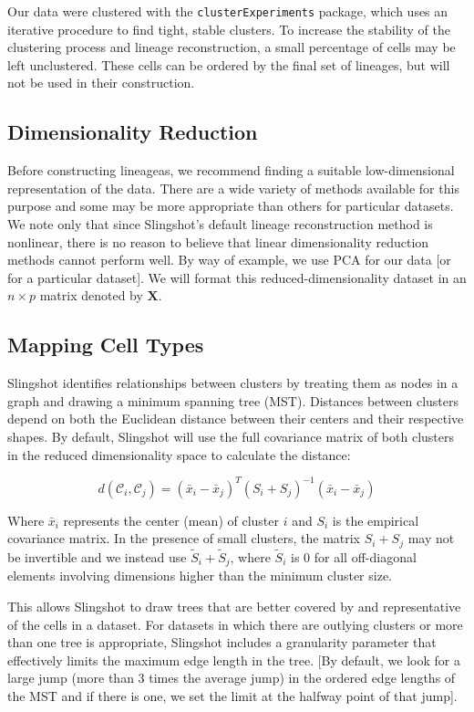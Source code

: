 \documentclass[11pt]{article}\usepackage[]{graphicx}\usepackage[]{color}
\begin{document}
Our data were clustered with the \texttt{clusterExperiments} package, which uses an iterative procedure to find tight, stable clusters. To increase the stability of the clustering process and lineage reconstruction, a small percentage of cells may be left unclustered. These cells can be ordered by the final set of lineages, but will not be used in their construction.

\subsection{Dimensionality Reduction}
Before constructing lineageas, we recommend finding a suitable low-dimensional representation of the data. There are a wide variety of methods available for this purpose and some may be more appropriate than others for particular datasets. We note only that since Slingshot's default lineage reconstruction method is nonlinear, there is no reason to believe that linear dimensionality reduction methods cannot perform well. By way of example, we use PCA for our data [or for a particular dataset]. We will format this reduced-dimensionality dataset in an $n \times p$ matrix denoted by $\mathbf{X}$.

\subsection{Mapping Cell Types}
Slingshot identifies relationships between clusters by treating them as nodes in a graph and drawing a minimum spanning tree (MST). Distances between clusters depend on both the Euclidean distance between their centers and their respective shapes. By default, Slingshot will use the full covariance matrix of both clusters in the reduced dimensionality space to calculate the distance:

$$d(\mathcal{C}_i,\mathcal{C}_j) = (\bar{x}_i - \bar{x}_j)^T (S_i + S_j)^{-1} (\bar{x}_i - \bar{x}_j)$$

Where $\bar{x}_i$ represents the center (mean) of cluster $i$ and $S_i$ is the empirical covariance matrix. In the presence of small clusters, the matrix $S_i + S_j$ may not be invertible and we instead use $\tilde{S}_i + \tilde{S}_j$, where $\tilde{S}_i$ is $0$ for all off-diagonal elements involving dimensions higher than the minimum cluster size.

This allows Slingshot to draw trees that are better covered by and representative of the cells in a dataset. For datasets in which there are outlying clusters or more than one tree is appropriate, Slingshot includes a granularity parameter that effectively limits the maximum edge length in the tree. [By default, we look for a large jump (more than 3 times the average jump) in the ordered edge lengths of the MST and if there is one, we set the limit at the halfway point of that jump]. 
\end{document}
